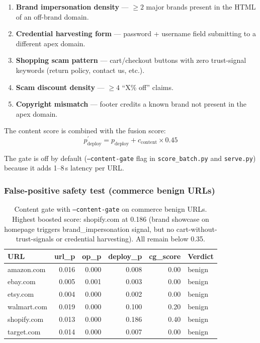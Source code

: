 \documentclass[11pt,a4paper]{article}
\newcommand{\code}[1]{\texttt{#1}}
\begin{document}
\begin{enumerate}[noitemsep]
  \item \textbf{Brand impersonation density} --- $\geq 2$ major brands
        present in the HTML of an off-brand domain.
  \item \textbf{Credential harvesting form} --- password + username
        field submitting to a different apex domain.
  \item \textbf{Shopping scam pattern} --- cart/checkout buttons with
        zero trust-signal keywords (return policy, contact us, etc.).
  \item \textbf{Scam discount density} --- $\geq 4$ ``X\% off'' claims.
  \item \textbf{Copyright mismatch} --- footer credits a known brand
        not present in the apex domain.
\end{enumerate}

The content score is combined with the fusion score:
\[
  p_{\text{deploy}}^{\prime} = p_{\text{deploy}} + c_{\text{content}} \times 0.45
\]

The gate is off by default (\code{--content-gate} flag in
\code{score\_batch.py} and \code{serve.py}) because it adds
1--8\,s latency per URL.

\subsubsection*{False-positive safety test (commerce benign URLs)}

\begin{table}[h]
\centering
\small
\begin{tabular}{lrrrrl}
\toprule
URL & url\_p & op\_p & deploy\_p & cg\_score & Verdict \\
\midrule
amazon.com & 0.016 & 0.000 & 0.008 & 0.00 & benign \\
ebay.com & 0.005 & 0.001 & 0.003 & 0.00 & benign \\
etsy.com & 0.004 & 0.000 & 0.002 & 0.00 & benign \\
walmart.com & 0.019 & 0.000 & 0.100 & 0.20 & benign \\
shopify.com & 0.013 & 0.000 & 0.186 & 0.40 & benign \\
target.com & 0.014 & 0.000 & 0.007 & 0.00 & benign \\
\bottomrule
\end{tabular}
\caption{Content gate with \code{--content-gate} on commerce benign
  URLs. Highest boosted score: shopify.com at 0.186 (brand showcase
  on homepage triggers brand\_impersonation signal, but no
  cart-without-trust-signals or credential harvesting).
  All remain below 0.35.}
\end{table}
\end{document}
